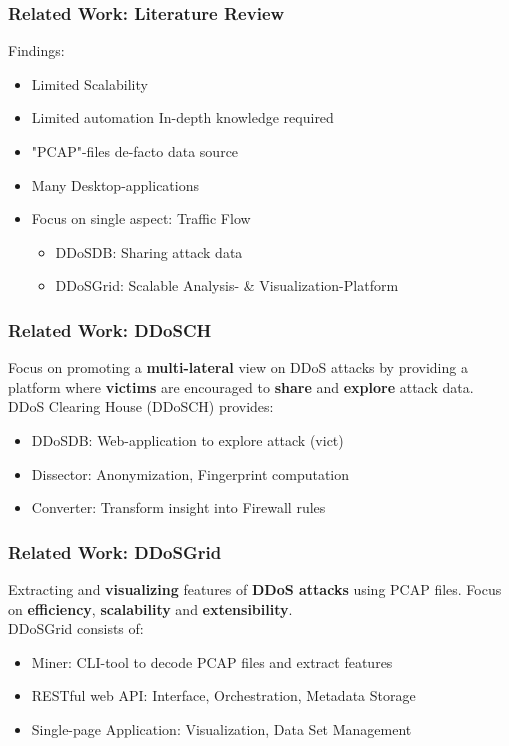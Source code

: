 \documentclass[fleqn]{beamer}
\begin{document}
    \begin{frame}
      \frametitle{Related Work: Literature Review}
      Findings:
      \begin{itemize}
          \item Limited Scalability \\
          \item Limited automation \rightarrow In-depth knowledge required\\
          \item "PCAP"-files de-facto data source\\
          \item Many Desktop-applications \\
          \item Focus on single aspect: Traffic Flow\\
          \begin{itemize}
              \item  DDoSDB: Sharing attack data\\
              \item DDoSGrid: Scalable Analysis- \& Visualization-Platform
          \end{itemize}
      \end{itemize}
    \end{frame}
    
    \begin{frame}
      \frametitle{Related Work: DDoSCH}
      Focus on promoting a \textbf{multi-lateral} view on DDoS attacks by providing a platform where \textbf{victims} are encouraged to \textbf{share} and \textbf{explore} attack data.\\
      \vfill
      DDoS Clearing House (DDoSCH) provides:
      \begin{itemize}
          \item DDoSDB: Web-application to explore attack (vict)
          \item Dissector: Anonymization, Fingerprint computation
          \item Converter: Transform insight into Firewall rules
      \end{itemize}
    \end{frame}
    
    \begin{frame}
      \frametitle{Related Work: DDoSGrid}
      Extracting and \textbf{visualizing} features of \textbf{DDoS attacks} using PCAP files. Focus on \textbf{efficiency}, \textbf{scalability} and \textbf{extensibility}.\\
      \vfill
      DDoSGrid consists of:
      \begin{itemize}
          \item Miner: CLI-tool to decode PCAP files and extract features
          \item RESTful web API: Interface, Orchestration, Metadata Storage
          \item Single-page Application: Visualization, Data Set Management
      \end{itemize}
    \end{frame}
    
\end{document}
